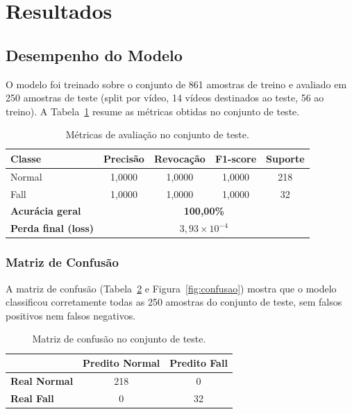 \documentclass[12pt,a4paper]{article}
\begin{document}
\section{Resultados}

\subsection{Desempenho do Modelo}

O modelo foi treinado sobre o conjunto de 861 amostras de treino e avaliado em 250 amostras de teste (split por vídeo, 14 vídeos destinados ao teste, 56 ao treino). A Tabela~\ref{tab:metricas} resume as métricas obtidas no conjunto de teste.

\begin{table}[H]
\centering
\caption{Métricas de avaliação no conjunto de teste.}
\label{tab:metricas}
\begin{tabular}{lcccc}
\toprule
\textbf{Classe} & \textbf{Precisão} & \textbf{Revocação} & \textbf{F1-score} & \textbf{Suporte} \\
\midrule
Normal & 1,0000 & 1,0000 & 1,0000 & 218 \\
Fall   & 1,0000 & 1,0000 & 1,0000 & 32 \\
\midrule
\textbf{Acurácia geral} & \multicolumn{4}{c}{\textbf{100,00\%}} \\
\textbf{Perda final (loss)} & \multicolumn{4}{c}{$3{,}93 \times 10^{-4}$} \\
\bottomrule
\end{tabular}
\end{table}

\subsubsection{Matriz de Confusão}

A matriz de confusão (Tabela~\ref{tab:confusao} e Figura~\ref{fig:confusao}) mostra que o modelo classificou corretamente todas as 250 amostras do conjunto de teste, sem falsos positivos nem falsos negativos.

\begin{table}[H]
\centering
\caption{Matriz de confusão no conjunto de teste.}
\label{tab:confusao}
\begin{tabular}{lcc}
\toprule
 & \textbf{Predito Normal} & \textbf{Predito Fall} \\
\midrule
\textbf{Real Normal} & 218 & 0 \\
\textbf{Real Fall}   & 0   & 32 \\
\bottomrule
\end{tabular}
\end{table}
\end{document}
